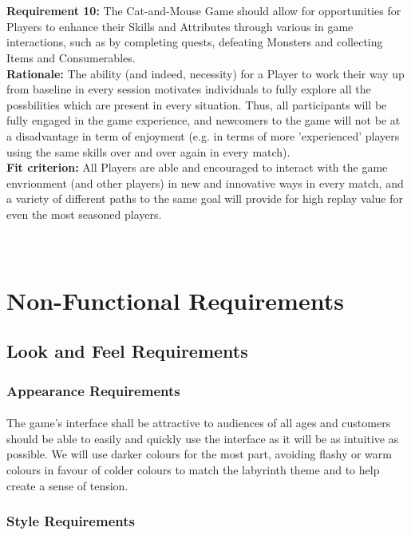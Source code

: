 \documentclass[12pt, titlepage]{article}
\begin{document}
\\\\
\textbf{Requirement 10:}  The Cat-and-Mouse Game should allow for opportunities for Players to enhance their Skills and Attributes through various in game interactions, such as by completing quests, defeating Monsters and collecting Items and Consumerables.   \\
\textbf{Rationale:}  The ability (and indeed, necessity) for a Player to work their way up from baseline in every session motivates individuals to fully explore all the possbilities which are present in every situation. Thus, all participants will be fully engaged in the game experience, and newcomers to the game will not be at a disadvantage in term of enjoyment (e.g. in terms of more 'experienced' players using the same skills over and over again in every match).\\
\textbf{Fit criterion:}  All Players are able and encouraged to interact with the game envrionment (and other players) in new and innovative ways in every match, and a variety of different paths to the same goal will provide for high replay value for even the most seasoned players.\\
\\\\
\section{Non-Functional Requirements}
\subsection{Look and Feel Requirements}
\subsubsection{Appearance Requirements}
\paragraph{}The game's interface shall be attractive to audiences of all ages and customers should be able to easily and quickly use the interface as it will be as intuitive as possible. We will use darker colours for the most part, avoiding flashy or warm colours in favour of colder colours to match the labyrinth theme and to help create a sense of tension.  
\subsubsection{Style Requirements}
\end{document}
